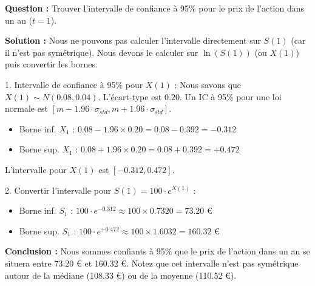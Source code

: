 \begin{examplebox}
\textbf{Question :} Trouver l'intervalle de confiance à 95\% pour le prix de l'action dans un an ($t=1$).

\textbf{Solution :}
Nous ne pouvons pas calculer l'intervalle directement sur $S(1)$ (car il n'est pas symétrique). Nous devons le calculer sur $\ln(S(1))$ (ou $X(1)$) puis convertir les bornes.

1.  Intervalle de confiance à 95\% pour $X(1)$ :
    Nous savons que $X(1) \sim N(0.08, 0.04)$. L'écart-type est $0.20$.
    Un IC à 95\% pour une loi normale est $\left[ m - 1.96 \cdot \sigma_{std}, m + 1.96 \cdot \sigma_{std} \right]$.
    \begin{itemize}
        \item Borne inf. $X_1$ : $0.08 - 1.96 \times 0.20 = 0.08 - 0.392 = -0.312$
        \item Borne sup. $X_1$ : $0.08 + 1.96 \times 0.20 = 0.08 + 0.392 = +0.472$
    \end{itemize}
    L'intervalle pour $X(1)$ est $[-0.312, 0.472]$.

2.  Convertir l'intervalle pour $S(1) = 100 \cdot e^{X(1)}$ :
    \begin{itemize}
        \item Borne inf. $S_1$ : $100 \cdot e^{-0.312} \approx 100 \times 0.7320 = 73.20 \text{ €}$
        \item Borne sup. $S_1$ : $100 \cdot e^{+0.472} \approx 100 \times 1.6032 = 160.32 \text{ €}$
    \end{itemize}

\textbf{Conclusion :} Nous sommes confiants à 95\% que le prix de l'action dans un an se situera entre 73.20 € et 160.32 €. Notez que cet intervalle n'est pas symétrique autour de la médiane (108.33 €) ou de la moyenne (110.52 €).
\end{examplebox}
